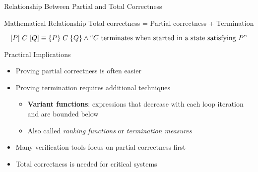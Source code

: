 \begin{frame}{Relationship Between Partial and Total Correctness}
    \begin{block}{Mathematical Relationship}
        Total correctness = Partial correctness + Termination
        
        \[[P]\ C\ [Q] \equiv \{P\}\; C\; \{Q\} \wedge \text{``$C$ terminates when started in a state satisfying $P$''}\]
    \end{block}
    
    \begin{block}{Practical Implications}
        \begin{itemize}
            \item Proving partial correctness is often easier
            \item Proving termination requires additional techniques
            \begin{itemize}
                \item \textbf{Variant functions}: expressions that decrease with each loop iteration and are bounded below
                \item Also called \emph{ranking functions} or \emph{termination measures}
            \end{itemize}
            \item Many verification tools focus on partial correctness first
            \item Total correctness is needed for critical systems
        \end{itemize}
    \end{block}
\end{frame}